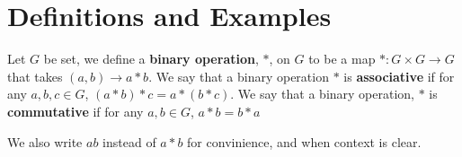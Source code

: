 \section{Definitions and Examples}
\label{section1}

\begin{definition}
  Let $G$ be set, we define a  \textbf{binary operation}, $\ast$, on  $G$ to
  be a map  $\ast:G \times G \rightarrow G$ that takes $(a,b) \rightarrow a
  \ast b$. We say that a binary operation $\ast$ is \textbf{associative} if
  for any $a,b,c \in G$,  $(a \ast b) \ast c=a \ast (b \ast c)$. We say that a
  binary operation, $\ast$ is \textbf{commutative} if for any $a,b \in G$,
  $a \ast b=b \ast a$
\end{definition}
We also write $ab$ instead of  $a \ast b$ for convinience, and when
context is clear.

